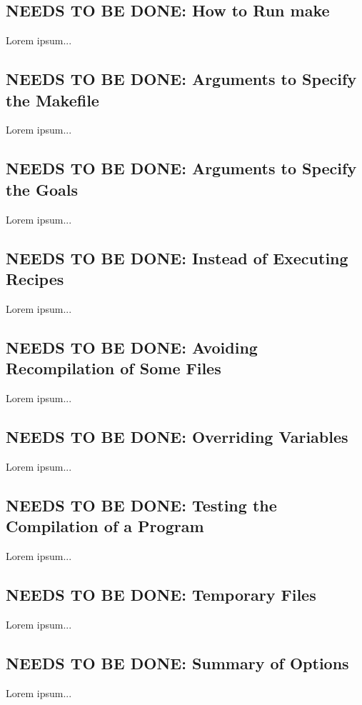 \documentclass{charun}
\begin{document}
\begin{multicols*}{2}
\color{gray}
\section{NEEDS TO BE DONE: How to Run make}
Lorem ipsum...
\color{black}


\color{gray}
\subsection{NEEDS TO BE DONE: Arguments to Specify the Makefile}
Lorem ipsum...
\color{black}

\color{gray}
\subsection{NEEDS TO BE DONE: Arguments to Specify the Goals}
Lorem ipsum...
\color{black}

\color{gray}
\subsection{NEEDS TO BE DONE: Instead of Executing Recipes}
Lorem ipsum...
\color{black}

\color{gray}
\subsection{NEEDS TO BE DONE: Avoiding Recompilation of Some Files}
Lorem ipsum...
\color{black}

\color{gray}
\subsection{NEEDS TO BE DONE: Overriding Variables}
Lorem ipsum...
\color{black}

\color{gray}
\subsection{NEEDS TO BE DONE: Testing the Compilation of a Program}
Lorem ipsum...
\color{black}

\color{gray}
\subsection{NEEDS TO BE DONE: Temporary Files}
Lorem ipsum...
\color{black}

\color{gray}
\subsection{NEEDS TO BE DONE: Summary of Options}
Lorem ipsum...
\color{black}



\end{multicols*}
\end{document}
